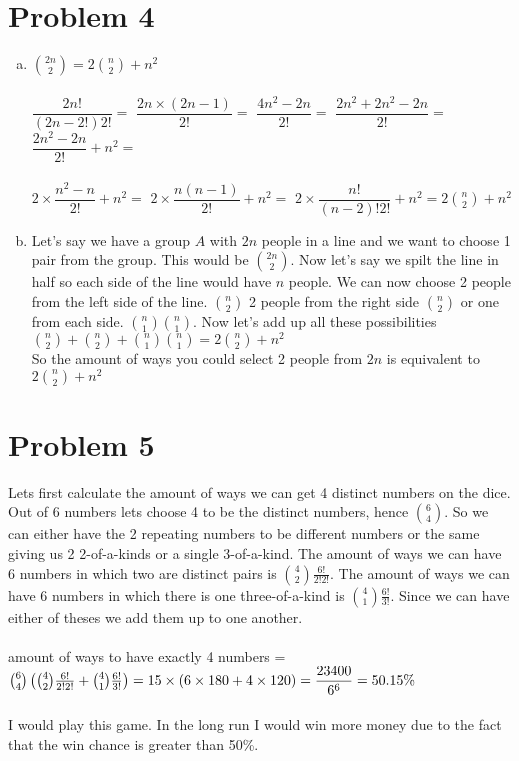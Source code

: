 \documentclass[11pt,letterpaper]{article}
\begin{document}
\section*{Problem 4}
\begin{enumerate}[(a)]
\item
${2n\choose2} = 2{n\choose 2} + n^2$\\\\
$\dfrac{2n!}{(2n-2!)2!}=$
$\dfrac{2n\times(2n-1)}{2!}=$
$\dfrac{4n^2-2n}{2!}=$
$\dfrac{2n^2 + 2n^2-2n}{2!}=$
$\dfrac{2n^2-2n}{2!} + n^2=$\\\\
$2\times\dfrac{n^2-n}{2!} + n^2=$
$2\times\dfrac{n(n-1)}{2!} + n^2=$
$2\times\dfrac{n!}{(n-2)!2!} + n^2= 2{n\choose 2} + n^2$
\item
Let's say we have a group $A$ with $2n$ people in a line and we want to choose 1 pair from the group. This would be ${2n\choose 2}$. Now let's say we spilt the line in half so each side of the line would have $n$ people. We can now choose 2 people from the left side of the line. ${n \choose 2}$ 2 people from the right side $n\choose 2$ or one from each side. ${n\choose1}{n\choose 1}$. Now let's add up all these possibilities\\
 ${n \choose 2}+ {n \choose 2} + {n\choose1}{n\choose 1} = 2{n \choose 2} + n^2$\\
 So the amount of ways you could select 2 people from $2n$ is equivalent to $2{n \choose 2} + n^2$
\end{enumerate}
\clearpage
\section*{Problem 5}
Lets first calculate the amount of ways we can get 4 distinct numbers on the dice.\\
Out of 6 numbers lets choose 4 to be the distinct numbers, hence ${6\choose 4}$. So we can either have the 2 repeating numbers to be different numbers or the same giving us 2 2-of-a-kinds or a single 3-of-a-kind. The amount of ways we can have 6 numbers in which two are distinct pairs is ${4 \choose 2}\frac{6!}{2!2!}$. The amount of ways we can have 6 numbers in which there is one three-of-a-kind is ${4\choose 1}\frac{6!}{3!}$. Since we can have either of theses we add them up to one another.\\\\
amount of ways to have exactly 4 numbers = ${6\choose 4}\left( 
{4 \choose 2}\frac{6!}{2!2!} + 
{4\choose 1}\frac{6!}{3!} 
\right) = 15\times (6\times180 + 4\times 120)\\\\
= \dfrac{23400}{6^6} = 50.15\%$\\\\
I would play this game. In the long run I would win more money due to the fact that the win chance is greater than 50\%.
\end{document}
